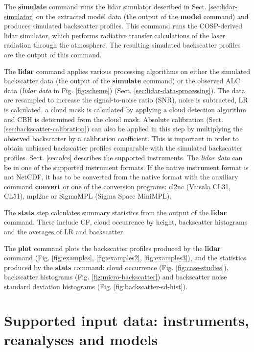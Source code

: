 The \textbf{simulate} command runs the lidar simulator described in Sect. \ref{sec:lidar-simulator}
on the extracted model data (the output of the \textbf{model} command) and produces simulated backscatter profiles. This command runs the COSP-derived lidar simulator, which performs
radiative transfer calculations of the laser radiation through the atmosphere.
The resulting simulated backscatter profiles are the output of this command.

The \textbf{lidar} command applies various processing algorithms on either
the simulated backscatter data (the output of the \textbf{simulate} command)
or the observed ALC data (\textit{lidar data} in Fig. \ref{fig:scheme})
(Sect. \ref{sec:lidar-data-processing}). The data are resampled
to increase the signal-to-noise ratio (SNR), noise is subtracted, LR is calculated,
a cloud mask is calculated by applying a cloud detection algorithm and CBH is determined
from the cloud mask. Absolute calibration (Sect. \ref{sec:backscatter-calibration})
can also be applied in this step by
multiplying the observed backscatter by a calibration coefficient. This is
important in order to obtain unbiased backscatter profiles comparable with the simulated
backscatter profiles. Sect. \ref{sec:alcs} describes the supported instruments.
The \textit{lidar data} can be in one of the supported instrument formats. If
the native instrument format is not NetCDF, it has to be converted from the native
format with the auxiliary command \textbf{convert} or one of the conversion
programs: cl2nc (Vaisala CL31, CL51), mpl2nc or SigmaMPL (Sigma Space MiniMPL).

The \textbf{stats} step calculates summary statistics from the output of the 
\textbf{lidar} command. These include CF, cloud occurrence by height,
backscatter histograms and the averages of LR and backscatter.

The \textbf{plot} command plots the backscatter profiles produced by the \textbf{lidar}
command (Fig. \ref{fig:examples}, \ref{fig:examples2}, \ref{fig:examples3}), and
the statistics produced by the \textbf{stats} command: cloud occurrence
(Fig. \ref{fig:case-studies}), backscatter histograms (Fig. \ref{fig:micro-backscatter})
and backscatter noise standard deviation histograms (Fig. \ref{fig:backscatter-sd-hist}).

\section{Supported input data: instruments, reanalyses and models}
\label{sec:supported-alcs-reanalyses-and-models}

